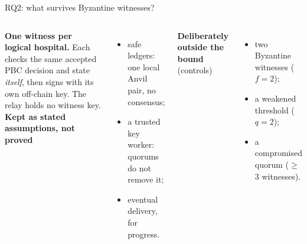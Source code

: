 \documentclass[aspectratio=169,10pt]{beamer}
\begin{document}
\begin{frame}{RQ2: what survives Byzantine witnesses?}
\begin{columns}[T,onlytextwidth]
\footnotesize
\textbf{One witness per logical hospital.} Each checks the same accepted PBC decision and state \emph{itself}, then signs with its own off-chain key. The relay holds no witness key.\\[0.4em]
\textbf{Kept as stated assumptions, not proved}
\begin{itemize}\scriptsize\setlength{\itemsep}{1pt}
  \item safe ledgers: one local Anvil pair, no consensus;
  \item a trusted key worker: quorums do not remove it;
  \item eventual delivery, for progress.
\end{itemize}
\textbf{Deliberately outside the bound} (controls)
\begin{itemize}\scriptsize\setlength{\itemsep}{1pt}
  \item two Byzantine witnesses ($f = 2$);
  \item a weakened threshold ($q = 2$);
  \item a compromised quorum ($\ge$ 3 witnesses).
\end{itemize}
\end{columns}
\end{frame}
\end{document}
